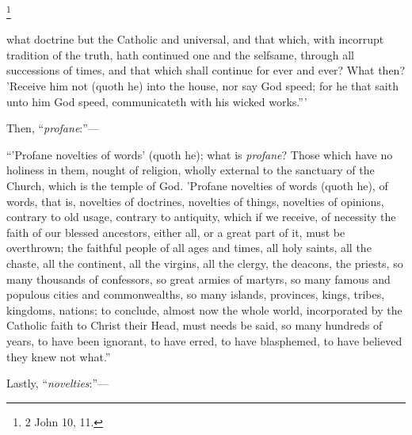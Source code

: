 \footnote{2 John 10, 11.}

what doctrine but the Catholic and universal, and that which,
with incorrupt tradition of the truth, hath continued one and the
selfsame, through all successions of times, and that which shall
continue for ever and ever? What then? 'Receive him not (quoth he)
into the house, nor say God speed; for he that saith unto him God
speed, communicateth with his wicked works.'''

Then, ``\emph{profane}:''—

``'Profane novelties of words' (quoth he); what is \emph{profane}?
Those which have no holiness in them, nought of religion, wholly
external to the sanctuary of the Church, which is the temple of God.
'Profane novelties of words (quoth he), of words, that is, novelties
of doctrines, novelties of things, novelties of opinions, contrary to
old usage, contrary to antiquity, which if we receive, of necessity
the faith of our blessed ancestors, either all, or a great part of it,
must be overthrown; the faithful people of all ages and times, all
holy saints, all the chaste, all the continent, all the virgins, all
the clergy, the deacons, the priests, so many thousands of confessors,
so great armies of martyrs, so many famous and populous cities and
commonwealths, so many islands, provinces, kings, tribes, kingdoms,
nations; to conclude, almost now the whole world, incorporated by the
Catholic faith to Christ their Head, must needs be said, so many hundreds of years, to have been ignorant, to have
erred, to have blasphemed, to have believed they knew not what.''

Lastly, ``\emph{novelties}:''—

